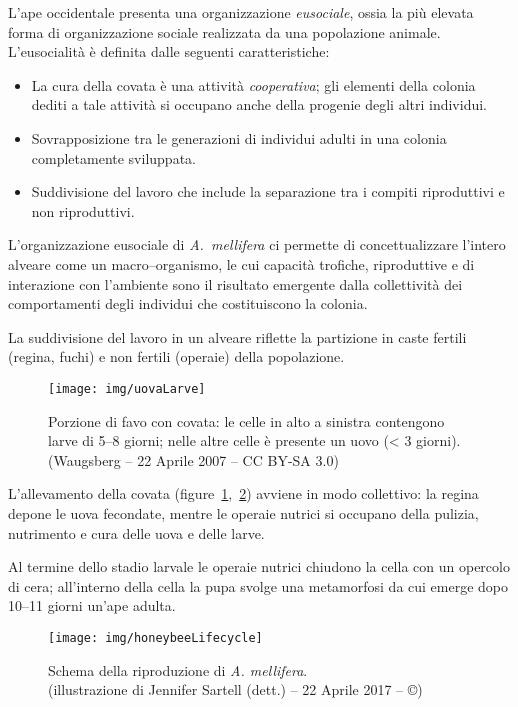 L'ape occidentale presenta una organizzazione \emph{eusociale}, ossia la più elevata forma di organizzazione sociale realizzata da una popolazione animale. L'eusocialità è definita dalle seguenti caratteristiche:
\begin{itemize}
    \item La cura della covata è una attività \emph{cooperativa}; gli elementi della colonia dediti a tale attività si occupano anche della progenie degli altri individui.
    \item Sovrapposizione tra le generazioni di individui adulti in una colonia completamente sviluppata.
    \item Suddivisione del lavoro che include la separazione tra i compiti riproduttivi e non riproduttivi.
\end{itemize}

L'organizzazione eusociale di \emph{A.~mellifera} ci permette di concettualizzare l'intero alveare come un macro--organismo, le cui capacità trofiche, riproduttive e di interazione con l'ambiente sono il risultato emergente dalla collettività dei comportamenti degli individui che costituiscono la colonia.

La suddivisione del lavoro in un alveare riflette la partizione in caste fertili (regina, fuchi) e non fertili (operaie) della popolazione.

\begin{figure}[hbp]
    \centering
    \texttt{[image: img/uovaLarve]}

    \caption[Covata giovane.]{Porzione di favo con covata: le celle in alto a sinistra contengono larve di 5--8 giorni; nelle altre celle è presente un uovo (< 3 giorni). \\ (Waugsberg -- 22 Aprile 2007 -- CC BY-SA 3.0)}
    \label{img:uovaLarve}
\end{figure}

L'allevamento della covata (figure~\ref{img:uovaLarve},~\ref{img:lifecycle}) avviene in modo collettivo: la regina depone le uova fecondate, mentre le operaie nutrici si occupano della pulizia, nutrimento e cura delle uova e delle larve.

Al termine dello stadio larvale le operaie nutrici chiudono la cella con un opercolo di cera; all'interno della cella la pupa svolge una metamorfosi da cui emerge dopo 10--11 giorni un'ape adulta.

\begin{figure}[hbp]
    \centering
    \texttt{[image: img/honeybeeLifecycle]}

    \caption[Ciclo vitale dell'ape.]{Schema della riproduzione di \emph{A. mellifera}.
        \\ (illustrazione di Jennifer Sartell (dett.) -- 22 Aprile 2017 -- ©)}
    \label{img:lifecycle}
\end{figure}

